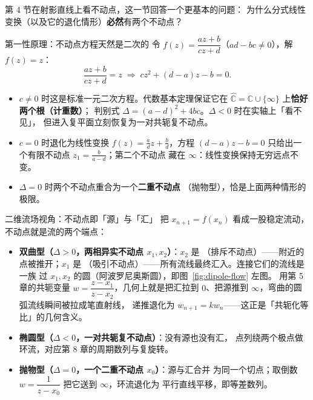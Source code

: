 第 4 节在射影直线上看不动点，这一节回答一个更基本的问题：
为什么分式线性变换（以及它的退化情形）\textbf{必然}有两个不动点？

\begin{corebox}{第一性原理：不动点方程天然是二次的}
令 $f(z)=\dfrac{az+b}{cz+d}$（$ad-bc\neq0$），解 $f(z)=z$：
\[
  \frac{az+b}{cz+d}=z\;\Longrightarrow\;cz^{2}+(d-a)z-b=0 .
\]
\begin{itemize}
  \item $c\neq0$ 时这是标准一元二次方程。代数基本定理保证它在
  $\hat{\mathbb{C}}=\mathbb{C}\cup\{\infty\}$ 上\textbf{恰好两个根（计重数）}；
  判别式 $\Delta=(a-d)^{2}+4bc$。$\Delta<0$ 时在实轴上「看不见」，
  但进入复平面立刻恢复为一对共轭复不动点。
  \item $c=0$ 时退化为线性变换 $f(z)=\tfrac ad z+\tfrac bd$，方程
  $(d-a)z-b=0$ 只给出一个有限不动点 $z_{1}=\tfrac{b}{a-d}$；第二个不动点
  藏在 $\infty$：线性变换保持无穷远点不变。
  \item $\Delta=0$ 时两个不动点重合为一个\textbf{二重不动点}
  （抛物型），恰是上面两种情形的极限。
\end{itemize}
\end{corebox}

\begin{methodbox}{二维流场视角：不动点即「源」与「汇」}
把 $x_{n+1}=f(x_n)$ 看成一股稳定流动，不动点就是流的两个端点：
\begin{itemize}
  \item \textbf{双曲型（$\Delta>0$，两相异实不动点 $x_1,x_2$）}：$x_2$ 是
  （排斥不动点）——附近的点被推开；$x_1$ 是
  （吸引不动点）——所有流线最终汇入。连接它们的流线是一族
  过 $x_1,x_2$ 的圆（阿波罗尼奥斯圆），即图~\ref{fig:dipole-flow} 左图。
  用第 5 章的共轭变量 $w=\dfrac{z-x_1}{z-x_2}$，几何上就是把汇拉到
  $0$、把源推到 $\infty$，弯曲的圆弧流线瞬间被拉成笔直射线，
  递推退化为 $w_{n+1}=kw_n$——这正是「共轭化等比」的几何含义。
  \item \textbf{椭圆型（$\Delta<0$，一对共轭复不动点）}：没有源也没有汇，
  点列绕两个极点做环流，对应第 8 章的周期数列与复旋转。
  \item \textbf{抛物型（$\Delta=0$，一个二重不动点 $x_0$）}：源与汇合并
  为同一个切点；取倒数 $w=\dfrac1{z-x_0}$ 把它送到 $\infty$，环流退化为
  平行直线平移，即等差数列。
\end{itemize}
\end{methodbox}

